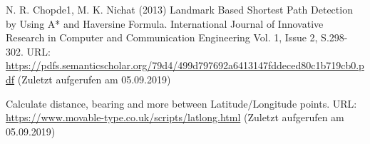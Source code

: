 \documentclass[12pt,oneside]{scrreprt}
\begin{document}
\begin{thebibliography}{10}
 N. R. Chopde1, M. K. Nichat (2013) Landmark Based Shortest Path Detection by Using A* and Haversine Formula. International Journal of Innovative Research in Computer and Communication Engineering Vol. 1, Issue 2, S.298-302. URL: \url{https://pdfs.semanticscholar.org/79d4/499d797692a6413147fddeced80c1b719cb0.pdf} (Zuletzt aufgerufen am 05.09.2019)

 Calculate distance, bearing and more between Latitude/Longitude points. URL: \url{https://www.movable-type.co.uk/scripts/latlong.html} (Zuletzt aufgerufen am 05.09.2019)








	\end{thebibliography}  
  \newpage
  
  \listoffigures
  \newpage
 
  
\end{document}
